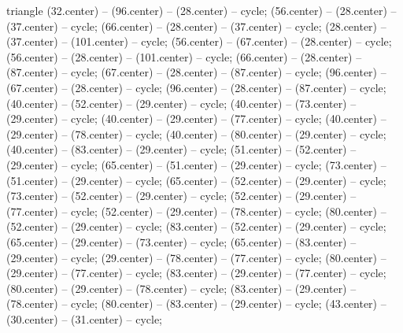 {\begin{pgfonlayer}{triangle}
 (32.center) -- (96.center) -- (28.center) -- cycle; 
 (56.center) -- (28.center) -- (37.center) -- cycle; 
 (66.center) -- (28.center) -- (37.center) -- cycle; 
 (28.center) -- (37.center) -- (101.center) -- cycle; 
 (56.center) -- (67.center) -- (28.center) -- cycle; 
 (56.center) -- (28.center) -- (101.center) -- cycle; 
 (66.center) -- (28.center) -- (87.center) -- cycle; 
 (67.center) -- (28.center) -- (87.center) -- cycle; 
 (96.center) -- (67.center) -- (28.center) -- cycle; 
 (96.center) -- (28.center) -- (87.center) -- cycle; 
 (40.center) -- (52.center) -- (29.center) -- cycle; 
 (40.center) -- (73.center) -- (29.center) -- cycle; 
 (40.center) -- (29.center) -- (77.center) -- cycle; 
 (40.center) -- (29.center) -- (78.center) -- cycle; 
 (40.center) -- (80.center) -- (29.center) -- cycle; 
 (40.center) -- (83.center) -- (29.center) -- cycle; 
 (51.center) -- (52.center) -- (29.center) -- cycle; 
 (65.center) -- (51.center) -- (29.center) -- cycle; 
 (73.center) -- (51.center) -- (29.center) -- cycle; 
 (65.center) -- (52.center) -- (29.center) -- cycle; 
 (73.center) -- (52.center) -- (29.center) -- cycle; 
 (52.center) -- (29.center) -- (77.center) -- cycle; 
 (52.center) -- (29.center) -- (78.center) -- cycle; 
 (80.center) -- (52.center) -- (29.center) -- cycle; 
 (83.center) -- (52.center) -- (29.center) -- cycle; 
 (65.center) -- (29.center) -- (73.center) -- cycle; 
 (65.center) -- (83.center) -- (29.center) -- cycle; 
 (29.center) -- (78.center) -- (77.center) -- cycle; 
 (80.center) -- (29.center) -- (77.center) -- cycle; 
 (83.center) -- (29.center) -- (77.center) -- cycle; 
 (80.center) -- (29.center) -- (78.center) -- cycle; 
 (83.center) -- (29.center) -- (78.center) -- cycle; 
 (80.center) -- (83.center) -- (29.center) -- cycle; 
 (43.center) -- (30.center) -- (31.center) -- cycle; 

\end{pgfonlayer}}
